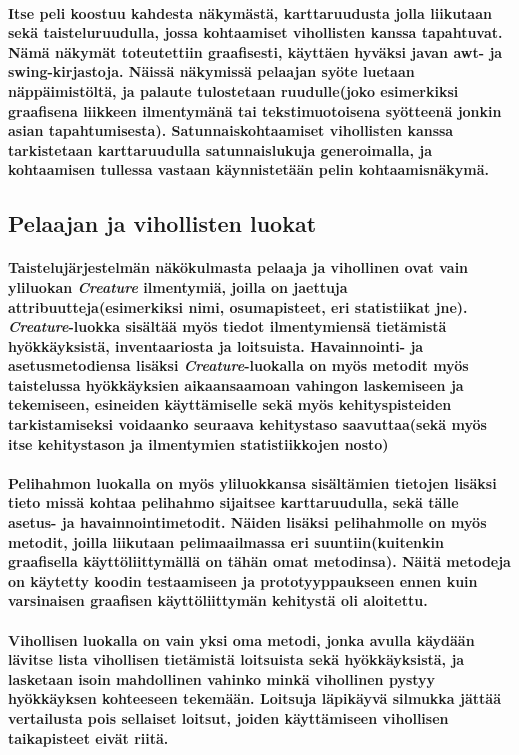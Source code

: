 \documentclass[10pt,a4paper,draft]{article}
\begin{document}
\paragraph{Itse peli koostuu kahdesta näkymästä, karttaruudusta jolla liikutaan sekä taisteluruudulla, jossa kohtaamiset vihollisten kanssa tapahtuvat. Nämä näkymät toteutettiin graafisesti, käyttäen hyväksi javan awt- ja swing-kirjastoja. Näissä näkymissä pelaajan syöte luetaan näppäimistöltä, ja palaute tulostetaan ruudulle(joko esimerkiksi graafisena liikkeen ilmentymänä tai tekstimuotoisena syötteenä jonkin asian tapahtumisesta). Satunnaiskohtaamiset vihollisten kanssa tarkistetaan karttaruudulla satunnaislukuja generoimalla, ja kohtaamisen tullessa vastaan käynnistetään pelin kohtaamisnäkymä.}

\subsection{Pelaajan ja vihollisten luokat}
\paragraph{Taistelujärjestelmän näkökulmasta pelaaja ja vihollinen ovat vain yliluokan \emph{Creature} ilmentymiä, joilla on jaettuja attribuutteja(esimerkiksi nimi, osumapisteet, eri statistiikat jne). \emph{Creature}-luokka sisältää myös tiedot ilmentymiensä tietämistä hyök\-käy\-ksi\-stä, inventaariosta ja loitsuista. Havainnointi- ja asetusmetodiensa lisäksi \emph{Creature}-luokalla on myös metodit myös taistelussa hyökkäyksien aikaansaamoan vahingon laskemiseen ja tekemiseen, esineiden käyttämiselle sekä myös kehityspisteiden tarkistamiseksi voidaanko seuraava kehitystaso saavuttaa(sekä myös itse kehitystason ja ilmentymien statistiikkojen nosto) }
\paragraph{Pelihahmon luokalla on myös yliluokkansa sisältämien tietojen lisäksi tieto missä kohtaa pelihahmo sijaitsee karttaruudulla, sekä tälle asetus- ja havainnointimetodit. Näiden lisäksi pelihahmolle on myös metodit, joilla liikutaan pelimaailmassa eri suuntiin(kuitenkin graafisella käyttöliittymällä on tähän omat metodinsa). Näitä metodeja on käytetty koodin testaamiseen ja prototyyppaukseen ennen kuin varsinaisen graafisen käyttöliittymän kehitystä oli aloitettu.}
\paragraph{Vihollisen luokalla on vain yksi oma metodi, jonka avulla käydään lävitse lista vihollisen tietämistä loitsuista sekä hyökkäyksistä, ja lasketaan isoin mahdollinen vahinko minkä vihollinen pystyy hyökkäyksen kohteeseen tekemään. Loitsuja läpikäyvä silmukka jättää vertailusta pois sellaiset loitsut, joiden käyttämiseen vihollisen taikapisteet eivät riitä.}
\newpage
\end{document}

